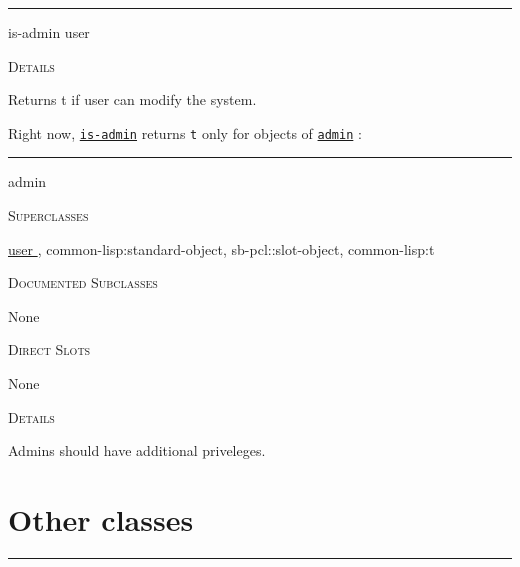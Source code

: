 \documentclass[a4paper]{report}
\begin{document}
                   

    \rule{\linewidth}{0.1mm}
    
    \label{example/class__fun__is-admin}
    \begin{defun}[Function]
    is-admin user


	
    \bigskip
    \textsc{Details}

Returns t if user can modify the system.


    
    \end{defun}
  
  

                   Right now, \hyperref[example/class__fun__is-admin]{\texttt{is-admin}}
   returns \texttt{t} only for objects of \hyperref[example/class__class__admin]{\texttt{admin}}
  :

                   

    \rule{\linewidth}{0.1mm}
    
    \label{example/class__class__admin}
    \begin{defun}[Class]
    admin


      
    \bigskip
    \textsc{Superclasses}

\hyperref[example/class__class__user]{
	  user
	}
      , \color[rgb]{0.5,0.5,0.5}common-lisp:standard-object\color[rgb]{0,0,0}, \color[rgb]{0.5,0.5,0.5}sb-pcl::slot-object\color[rgb]{0,0,0}, \color[rgb]{0.5,0.5,0.5}common-lisp:t\color[rgb]{0,0,0}


      
    \bigskip
    \textsc{Documented Subclasses}


	    None
	  


	
    \bigskip
    \textsc{Direct Slots}


	      None
	    


	
    \bigskip
    \textsc{Details}

Admins should have additional priveleges.


    
    \end{defun}
  
  
      \section{Other classes}
      

    \rule{\linewidth}{0.1mm}
    
\end{document}
